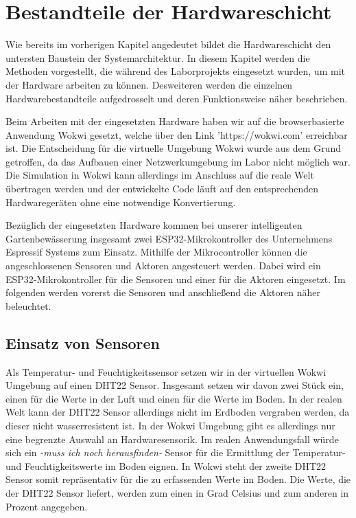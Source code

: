 
\section{Bestandteile der Hardwareschicht}

Wie bereits im vorherigen Kapitel angedeutet bildet die Hardwareschicht den untersten Baustein der Systemarchitektur. In diesem Kapitel werden die Methoden vorgestellt, die während des Laborprojekts eingesetzt wurden, um mit der Hardware arbeiten zu können. Desweiteren werden die einzelnen Hardwarebestandteile aufgedrosselt und deren Funktionsweise näher beschrieben.

Beim Arbeiten mit der eingesetzten Hardware haben wir auf die browserbasierte Anwendung Wokwi gesetzt, welche über den Link 'https://wokwi.com' erreichbar ist. Die Entscheidung für die virtuelle Umgebung Wokwi wurde aus dem Grund getroffen, da das Aufbauen einer Netzwerkumgebung im Labor nicht möglich war. Die Simulation in Wokwi kann allerdings im Anschluss auf die reale Welt übertragen werden und der entwickelte Code läuft auf den entsprechenden Hardwaregeräten ohne eine notwendige Konvertierung.

Bezüglich der eingesetzten Hardware kommen bei unserer intelligenten Gartenbewässerung insgesamt zwei ESP32-Mikrokontroller des Unternehmens Espressif Systems zum Einsatz. Mithilfe der Mikrocontroller können die angeschlossenen Sensoren und Aktoren angesteuert werden. Dabei wird ein ESP32-Mikrokontroller für die Sensoren und einer für die Aktoren eingesetzt. Im folgenden werden vorerst die Sensoren und anschließend die Aktoren näher beleuchtet.

\subsection{Einsatz von Sensoren}
Als Temperatur- und Feuchtigkeitssensor setzen wir in der virtuellen Wokwi Umgebung auf einen DHT22 Sensor. Insgesamt setzen wir davon zwei Stück ein, einen für die Werte in der Luft und einen für die Werte im Boden. In der realen Welt kann der DHT22 Sensor allerdings nicht im Erdboden vergraben werden, da dieser nicht wasserresistent ist. In der Wokwi Umgebung gibt es allerdings nur eine begrenzte Auswahl an Hardwaresensorik. Im realen Anwendungsfall würde sich ein \textit{-muss ich noch herausfinden-} Sensor für die Ermittlung der Temperatur- und Feuchtigkeitswerte im Boden eignen. In Wokwi steht der zweite DHT22 Sensor somit repräsentativ für die zu erfassenden Werte im Boden. Die Werte, die der DHT22 Sensor liefert, werden zum einen in Grad Celsius und zum anderen in Prozent angegeben.

